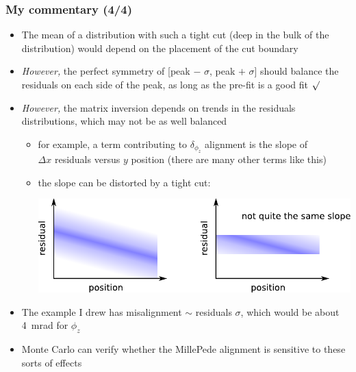 \documentclass[compress]{beamer}
\begin{document}
\begin{frame}
\frametitle{My commentary (4/4)}

\begin{itemize}\scriptsize
\item The mean of a distribution with such a tight cut (deep in the
  bulk of the distribution) would depend on the placement of the cut boundary
\item {\it However,} the perfect symmetry of [peak $-$ $\sigma$, peak
  $+$ $\sigma$] should balance the residuals on each side of the peak,
  as long as the pre-fit is a good fit $\surd$
\item {\it However,} the matrix inversion depends on trends in the
  residuals distributions, which may not be as well balanced
\begin{itemize}\setlength{\itemsep}{0.1 cm}\scriptsize
\item for example, a term contributing to $\delta_{\phi_z}$ alignment
  is the slope of \\ $\Delta x$ residuals versus $y$ position (there are many other terms like this)
\item the slope can be distorted by a tight cut:

\begin{center}
\includegraphics[width=0.8\linewidth]{residuals_with_a_cut.pdf}
\end{center}
\end{itemize}
\item The example I drew has misalignment $\sim$ residuals $\sigma$,
  which would be about 4~mrad for $\phi_z$

\item Monte Carlo can verify whether the MillePede alignment is sensitive
  to these sorts of effects
\end{itemize}
\end{frame}
\end{document}
